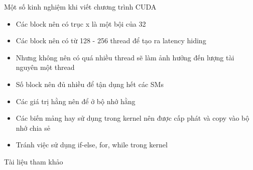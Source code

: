 \documentclass[10pt]{beamer}
\theoremstyle{remark}
\numberwithin{algocf}{section}
\numberwithin{equation}{section}
\numberwithin{dl}{section}
\numberwithin{figure}{section}
\begin{document}
\begin{frame}{Một số kinh nghiệm khi viết chương trình CUDA}
    \begin{itemize}
        \item Các block nên có trục x là một bội của 32
        \item Các block nên có từ 128 - 256 thread để tạo ra latency hiding
        \item Nhưng không nên có quá nhiều thread sẽ làm ảnh hưởng đến lượng tài nguyên một thread
        \item Số block nên đủ nhiều để tận dụng hết các SMs
        \item Các giá trị hằng nên để ở bộ nhớ hằng
        \item Các biến mảng hay sử dụng trong kernel nên được cấp phát và copy vào bộ nhớ chia sẻ
        \item Tránh việc sử dụng if-else, for, while trong kernel 
    \end{itemize}
\end{frame}

\begin{frame}{Tài liệu tham khảo}
    \printbibliography
\end{frame}
\end{document}
